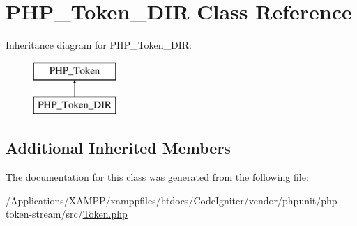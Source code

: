 \hypertarget{class_p_h_p___token___d_i_r}{}\section{P\+H\+P\+\_\+\+Token\+\_\+\+D\+IR Class Reference}
\label{class_p_h_p___token___d_i_r}
Inheritance diagram for P\+H\+P\+\_\+\+Token\+\_\+\+D\+IR\+:\begin{figure}[H]
\begin{center}
\leavevmode
\includegraphics[height=2.000000cm]{class_p_h_p___token___d_i_r}
\end{center}
\end{figure}
\subsection*{Additional Inherited Members}


The documentation for this class was generated from the following file\+:\begin{DoxyCompactItemize}
\item 
/\+Applications/\+X\+A\+M\+P\+P/xamppfiles/htdocs/\+Code\+Igniter/vendor/phpunit/php-\/token-\/stream/src/\mbox{\hyperlink{_token_8php}{Token.\+php}}\end{DoxyCompactItemize}
